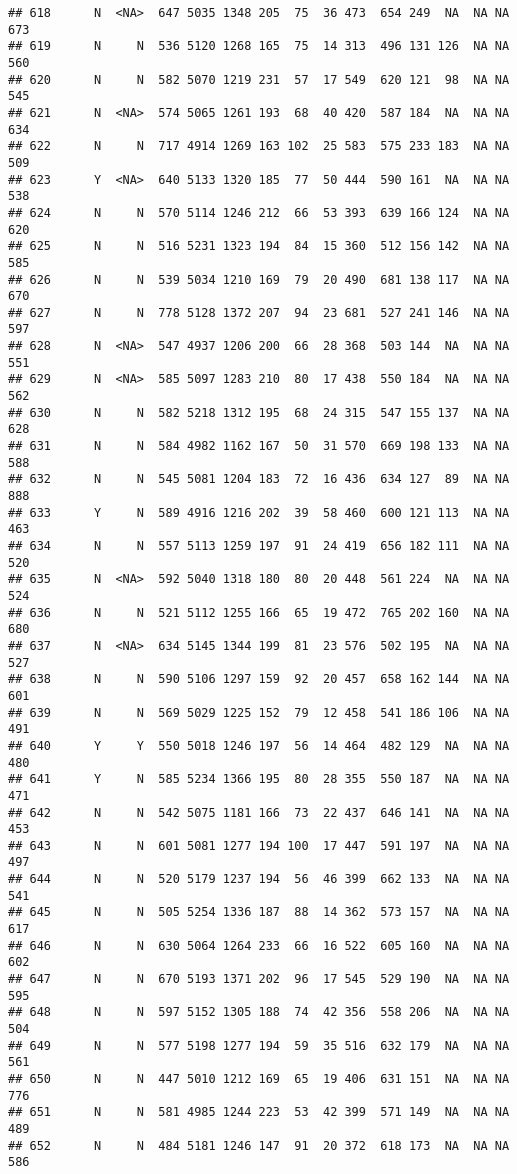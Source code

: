 \documentclass[]{article}
\begin{document}
\begin{verbatim}
## 618      N  <NA>  647 5035 1348 205  75  36 473  654 249  NA  NA NA  673
## 619      N     N  536 5120 1268 165  75  14 313  496 131 126  NA NA  560
## 620      N     N  582 5070 1219 231  57  17 549  620 121  98  NA NA  545
## 621      N  <NA>  574 5065 1261 193  68  40 420  587 184  NA  NA NA  634
## 622      N     N  717 4914 1269 163 102  25 583  575 233 183  NA NA  509
## 623      Y  <NA>  640 5133 1320 185  77  50 444  590 161  NA  NA NA  538
## 624      N     N  570 5114 1246 212  66  53 393  639 166 124  NA NA  620
## 625      N     N  516 5231 1323 194  84  15 360  512 156 142  NA NA  585
## 626      N     N  539 5034 1210 169  79  20 490  681 138 117  NA NA  670
## 627      N     N  778 5128 1372 207  94  23 681  527 241 146  NA NA  597
## 628      N  <NA>  547 4937 1206 200  66  28 368  503 144  NA  NA NA  551
## 629      N  <NA>  585 5097 1283 210  80  17 438  550 184  NA  NA NA  562
## 630      N     N  582 5218 1312 195  68  24 315  547 155 137  NA NA  628
## 631      N     N  584 4982 1162 167  50  31 570  669 198 133  NA NA  588
## 632      N     N  545 5081 1204 183  72  16 436  634 127  89  NA NA  888
## 633      Y     N  589 4916 1216 202  39  58 460  600 121 113  NA NA  463
## 634      N     N  557 5113 1259 197  91  24 419  656 182 111  NA NA  520
## 635      N  <NA>  592 5040 1318 180  80  20 448  561 224  NA  NA NA  524
## 636      N     N  521 5112 1255 166  65  19 472  765 202 160  NA NA  680
## 637      N  <NA>  634 5145 1344 199  81  23 576  502 195  NA  NA NA  527
## 638      N     N  590 5106 1297 159  92  20 457  658 162 144  NA NA  601
## 639      N     N  569 5029 1225 152  79  12 458  541 186 106  NA NA  491
## 640      Y     Y  550 5018 1246 197  56  14 464  482 129  NA  NA NA  480
## 641      Y     N  585 5234 1366 195  80  28 355  550 187  NA  NA NA  471
## 642      N     N  542 5075 1181 166  73  22 437  646 141  NA  NA NA  453
## 643      N     N  601 5081 1277 194 100  17 447  591 197  NA  NA NA  497
## 644      N     N  520 5179 1237 194  56  46 399  662 133  NA  NA NA  541
## 645      N     N  505 5254 1336 187  88  14 362  573 157  NA  NA NA  617
## 646      N     N  630 5064 1264 233  66  16 522  605 160  NA  NA NA  602
## 647      N     N  670 5193 1371 202  96  17 545  529 190  NA  NA NA  595
## 648      N     N  597 5152 1305 188  74  42 356  558 206  NA  NA NA  504
## 649      N     N  577 5198 1277 194  59  35 516  632 179  NA  NA NA  561
## 650      N     N  447 5010 1212 169  65  19 406  631 151  NA  NA NA  776
## 651      N     N  581 4985 1244 223  53  42 399  571 149  NA  NA NA  489
## 652      N     N  484 5181 1246 147  91  20 372  618 173  NA  NA NA  586

\end{verbatim}
\end{document}
